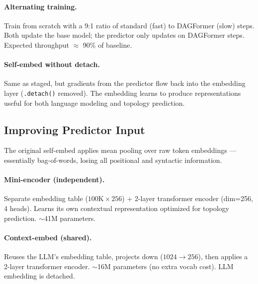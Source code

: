 \documentclass[11pt,a4paper]{article}
\begin{document}
\paragraph{Alternating training.} Train from scratch with a 9:1 ratio of standard (fast) to DAGFormer (slow) steps. Both update the base model; the predictor only updates on DAGFormer steps. Expected throughput $\approx$ 90\% of baseline.

\paragraph{Self-embed without detach.} Same as staged, but gradients from the predictor flow back into the embedding layer (\texttt{.detach()} removed). The embedding learns to produce representations useful for both language modeling and topology prediction.

\subsection{Improving Predictor Input}

The original self-embed applies mean pooling over raw token embeddings --- essentially bag-of-words, losing all positional and syntactic information.

\paragraph{Mini-encoder (independent).} Separate embedding table ($100\text{K} \times 256$) + 2-layer transformer encoder (dim=256, 4 heads). Learns its own contextual representation optimized for topology prediction. $\sim$41M parameters.

\paragraph{Context-embed (shared).} Reuses the LLM's embedding table, projects down ($1024 \to 256$), then applies a 2-layer transformer encoder. $\sim$16M parameters (no extra vocab cost). LLM embedding is detached.
\end{document}
